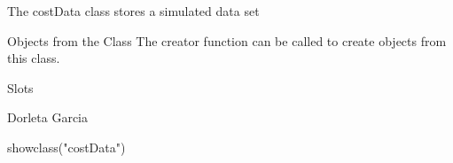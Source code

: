 \begin{Description}\relax
The costData class stores a simulated data set
\end{Description}
\begin{Section}{Objects from the Class}
The creator function  can be called to create objects from this class.
\end{Section}
\begin{Section}{Slots}
\end{Section}
\begin{Author}\relax
Dorleta Garcia 
\end{Author}
\begin{Examples}
\begin{ExampleCode}
showclass("costData")
\end{ExampleCode}
\end{Examples}

